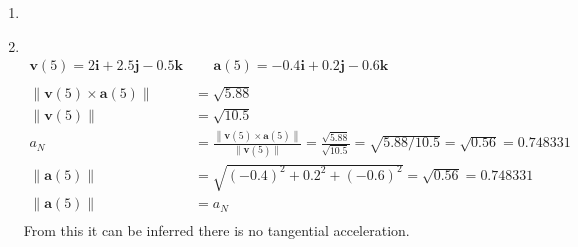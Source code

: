 \documentclass[11pt]{article}
\newcommand\Item[1][]{%
  \ifx\relax#1\relax  \item \else \item[#1] \fi
  \abovedisplayskip=0pt\abovedisplayshortskip=0pt~\vspace*{-\baselineskip}}
\begin{document}
\begin{enumerate}
\begin{enumerate}
              \Item
              \begin{align*}
                  \textbf{v}(5) = 2 \textbf{i} + 2.5 \textbf{j} - 0.5 \textbf{k} & \;\;\;\;\; \textbf{a}(5) = -0.4 \textbf{i} + 0.2 \textbf{j} - 0.6 \textbf{k}                                                                              \\\\
                  \left\|\textbf{v}(5) \times \textbf{a}(5)\right\|              & = \sqrt{5.88}                                                                                                                                             \\
                  \| \textbf{v}(5) \|                                            & = \sqrt{10.5}                                                                                                                                             \\
                  a_{N}                                                          & = \frac{\left\|\textbf{v}(5) \times \textbf{a}(5)\right\|}{\| \textbf{v}(5) \|} = \frac{\sqrt{5.88}}{\sqrt{10.5}} = \sqrt{5.88/10.5}=\sqrt{0.56}=0.748331 \\
                  \| \textbf{a}(5) \|                                            & = \sqrt{(-0.4)^2 + 0.2^2 + (-0.6)^2} = \sqrt{0.56}=0.748331                                                                                               \\
                  \| \textbf{a}(5) \|                                            & = a_{N}                                                                                                                                                   \\
              \end{align*}
              From this it can be inferred there is no tangential acceleration.
          \end{enumerate}
\end{enumerate}
\end{document}

